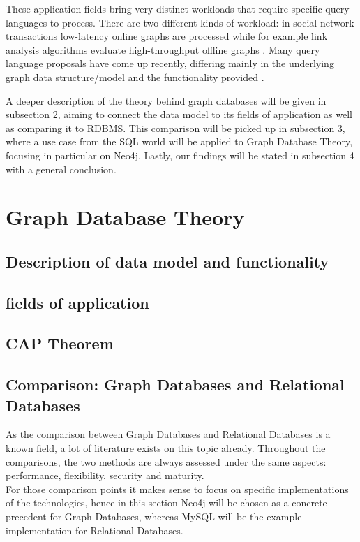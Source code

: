 These application fields bring very distinct workloads that require specific query languages to process. There are two different kinds of workload: in social network transactions low-latency online graphs are processed while for example link analysis algorithms evaluate high-throughput offline graphs \cite{Angles2018AnIT}. Many query language proposals have come up recently, differing mainly in the underlying graph data structure/model and the functionality provided \cite{Wood2012QueryLF}.

A deeper description of the theory behind graph databases will be given in subsection 2, aiming to connect the data model to its fields of application as well as comparing it to RDBMS. This comparison will be picked up in subsection 3, where a use case from the SQL world will be applied to Graph Database Theory, focusing in particular on Neo4j. Lastly, our findings will be stated in subsection 4 with a general conclusion.


\section{Graph Database Theory}
\subsection{Description of data model and functionality}
\subsection{fields of application}
\subsection{CAP Theorem}
\subsection{Comparison: Graph Databases and Relational Databases}
As the comparison between Graph Databases and Relational Databases is a known field, a lot of literature exists on this topic already. Throughout the comparisons, the two methods are always assessed under the same aspects: performance, flexibility, security and maturity. \\
For those comparison points it makes sense to focus on specific implementations of the technologies, hence in this section Neo4j will be chosen as a concrete precedent for Graph Databases, whereas MySQL will be the example implementation for Relational Databases.

